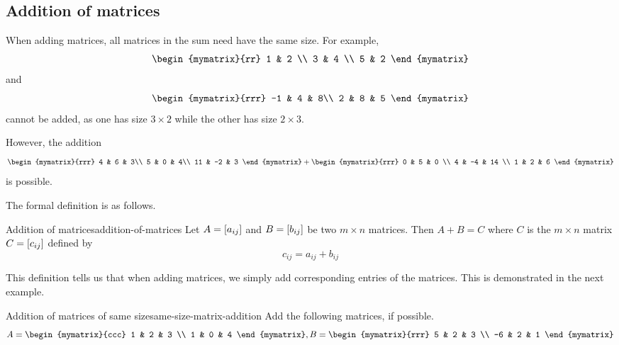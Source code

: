 \subsection{Addition of matrices}

When adding matrices, all matrices in the sum need have the same size.
For example,
\begin{equation*}
\begin{mymatrix}{rr}
1 & 2 \\
3 & 4 \\
5 & 2
\end{mymatrix} 
\end{equation*}
and
\begin{equation*}
\begin{mymatrix}{rrr}
-1 & 4 & 8\\
2 & 8 & 5
\end{mymatrix} 
\end{equation*}
cannot be added, as one has size $3 \times 2$ while the other has size $2 \times 3$.

However, the addition
\begin{equation*}
\begin{mymatrix}{rrr}
4 & 6 & 3\\
5 & 0 & 4\\
11 & -2 & 3
\end{mymatrix} 
+
\begin{mymatrix}{rrr}
0 & 5 & 0 \\
4 & -4 & 14 \\
1 & 2 & 6
\end{mymatrix}
\end{equation*}
is possible.

The formal definition is as follows.

\begin{definition}{Addition of matrices}{addition-of-matrices}
Let $A=\left[a_{ij}\right] $ and $B=\left[b_{ij}\right] $ be two
$m\times n$ matrices. Then $A+B=C$ where $C$ is the $m \times n$
matrix $C=\left[c_{ij}\right]$ defined by
\begin{equation*}
c_{ij}=a_{ij}+b_{ij}
\end{equation*}

\end{definition}

This definition tells us that when adding matrices, we simply add corresponding entries of the matrices. 
This is demonstrated in the next example. 

\begin{example}{Addition of matrices of same size}{same-size-matrix-addition}
Add the following matrices, if possible.
\begin{equation*}
A = \begin{mymatrix}{ccc}
1 & 2 & 3 \\
1 & 0 & 4
\end{mymatrix},
B = \begin{mymatrix}{rrr}
5 & 2 & 3 \\
-6 & 2 & 1
\end{mymatrix}
\end{equation*}
\end{example}

